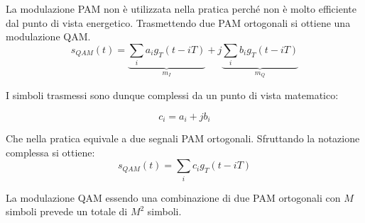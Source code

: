 La modulazione PAM non è utilizzata nella pratica perché non è molto efficiente dal punto di vista energetico.
Trasmettendo due PAM ortogonali si ottiene una modulazione QAM.
\[  
    s_{QAM}(t) = \underbrace{\sum_{i} a_i g_T(t - iT)}_{m_I} + j \underbrace{\sum_{i} b_i g_T(t - iT)}_{m_Q}
\]


I simboli trasmessi sono dunque complessi da un punto di vista matematico:

\[
    c_i = a_i + jb_i
\]

Che nella pratica equivale a due segnali PAM ortogonali.
Sfruttando la notazione complessa si ottiene:
\[
    s_{QAM}(t) = \sum_{i} c_i g_T(t - iT)
\]

La modulazione QAM essendo una combinazione di due PAM ortogonali con $M$ simboli prevede un totale di $M^2$ simboli. 







\begin{minipage}{.5\textwidth}
    \centering

\end{minipage}
\noindent
\begin{minipage}{.5\textwidth}

    \centering


\end{minipage}

